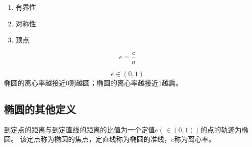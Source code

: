 \begin{example}
    
\end{example}
\begin{character}[椭圆的性质]
\begin{enumerate}
    \item 有界性
    \item 对称性
    \item 顶点
\end{enumerate}
\end{character}
\begin{definition}[离心率]
    \begin{equation}
        e=\frac{c}{a}
    \end{equation}
\end{definition}
\begin{theorem}[椭圆的离心率]
    \begin{equation}
        e\in (0,1)
    \end{equation}
    椭圆的离心率越接近\(0\)则越圆；椭圆的离心率越接近\(1\)越扁。
\end{theorem}

\begin{definition}[通径]
    
\end{definition}

\clearpage












\subsection{椭圆的其他定义}
\begin{definition}[椭圆的第二定义]
    到定点的距离与到定直线的距离的比值为一个定值\(e(\in(0,1))\)的点的轨迹为椭圆。
    该定点称为椭圆的焦点，定直线称为椭圆的准线，\(e\)称为离心率。
\end{definition}

